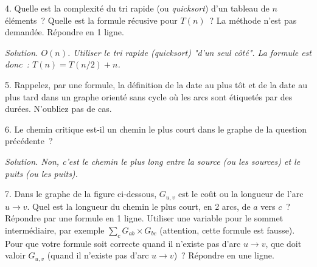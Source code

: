 \documentclass[11pt]{article}
\newcommand{\comment}[1]{}
\begin{document}
 
4.  Quelle est la complexité du tri rapide (ou {\it quicksort}) d'un tableau de $n$ éléments~? Quelle est la formule récusive pour $T(n)$~? La méthode n'est pas demandée.
Répondre en 1 ligne.

 
\ifcorrige
{\it Solution. $O(n)$. Utiliser le tri rapide (quicksort) "d'un seul côté".
La formule est donc~: $T(n)=T(n/2)+n$.
}
\else
\fi

\comment{
5. Peut-on utiliser l'algorithme de Dijkstra quand les arcs portent des coûts négatifs~? Même question pour l'algorithme de  Ford (ou Ford-Bellman, ou Bellman-Ford, ou Bellman–Ford–Moore\footnote{En fait, Alfonso Shimbel l'a proposé avant, en 1955 [Wikipedia].})~? %
\ifcorrige
{\it Solution. Non pour Dijkstra. Oui pour Ford.}
\else
\fi
}


\comment{
6. Un graphe orienté a des arcs étiquetés avec des coûts négatifs. Existe-t-il forcément des circuits de coût global négatif~? Si oui, prouvez-le~; sinon, prouvez-le.
%
\ifcorrige
{\it Solution. Non, pas forcément. Un contre-exemple suffit pour le prouver. Le graphe qui ne contient que l'arc~: $a\rightarrow b$ de coût $-1$ n'a pas de cycle donc pas de cycle de coût global négatif. Autre contre-exemple~: le graphe avec deux arcs~: $a\rightarrow b$ de coût $-1$ et $b\rightarrow a$ de coût 2. 
}
\else
\fi
}
 
5. Rappelez, par une formule, la définition de la date au plus tôt et de la date au plus tard dans un graphe orienté sans cycle où les arcs sont étiquetés par des durées. N'oubliez pas de cas.  %

\else
\fi

 
6. Le chemin critique est-il un chemin le plus court dans le graphe de la question précédente~?

\ifcorrige
{\it Solution. Non, c'est le chemin le plus long entre la source (ou les sources) et le puits (ou les puits).
}
\else
\fi

 
7. Dans le  graphe de la figure ci-dessous, $G_{u,v}$ est le coût ou la longueur de l'arc $u\rightarrow v$. Quel est la longueur du chemin le plus court, en 2 arcs, de $a$ vers $c$~? 
Répondre par une formule en 1 ligne.
Utiliser une variable pour le sommet intermédiaire, par exemple $\sum_c G_{ab}\times G_{bc}$ (attention, cette formule est fausse).
Pour que votre formule soit correcte quand il n'existe pas d'arc $u\rightarrow v$, que doit valoir $G_{u,v}$ (quand  il n'existe pas d'arc $u\rightarrow v$)~?
Répondre en une ligne.
\end{document}
